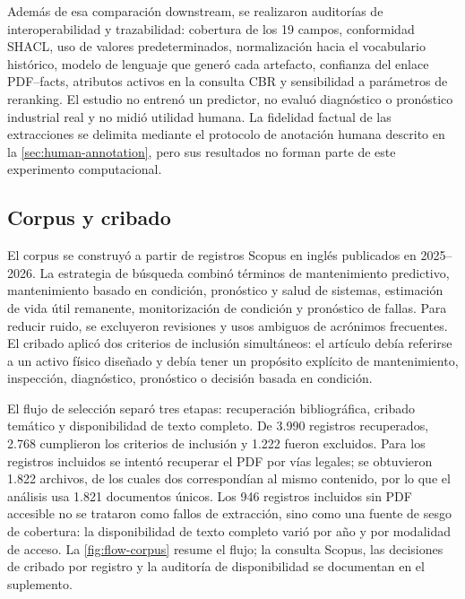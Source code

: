 \documentclass[11pt,a4paper]{article}
\begin{document}
Además de esa comparación downstream, se realizaron auditorías de interoperabilidad y trazabilidad: cobertura de los 19 campos, conformidad SHACL, uso de valores predeterminados, normalización hacia el vocabulario histórico, modelo de lenguaje que generó cada artefacto, confianza del enlace PDF--facts, atributos activos en la consulta CBR y sensibilidad a parámetros de reranking. El estudio no entrenó un predictor, no evaluó diagnóstico o pronóstico industrial real y no midió utilidad humana. La fidelidad factual de las extracciones se delimita mediante el protocolo de anotación humana descrito en la \cref{sec:human-annotation}, pero sus resultados no forman parte de este experimento computacional.

\subsection{Corpus y cribado}

El corpus se construyó a partir de registros Scopus en inglés publicados en 2025--2026. La estrategia de búsqueda combinó términos de mantenimiento predictivo, mantenimiento basado en condición, pronóstico y salud de sistemas, estimación de vida útil remanente, monitorización de condición y pronóstico de fallas. Para reducir ruido, se excluyeron revisiones y usos ambiguos de acrónimos frecuentes. El cribado aplicó dos criterios de inclusión simultáneos: el artículo debía referirse a un activo físico diseñado y debía tener un propósito explícito de mantenimiento, inspección, diagnóstico, pronóstico o decisión basada en condición.

El flujo de selección separó tres etapas: recuperación bibliográfica, cribado temático y disponibilidad de texto completo. De 3.990 registros recuperados, 2.768 cumplieron los criterios de inclusión y 1.222 fueron excluidos. Para los registros incluidos se intentó recuperar el PDF por vías legales; se obtuvieron 1.822 archivos, de los cuales dos correspondían al mismo contenido, por lo que el análisis usa 1.821 documentos únicos. Los 946 registros incluidos sin PDF accesible no se trataron como fallos de extracción, sino como una fuente de sesgo de cobertura: la disponibilidad de texto completo varió por año y por modalidad de acceso. La \cref{fig:flow-corpus} resume el flujo; la consulta Scopus, las decisiones de cribado por registro y la auditoría de disponibilidad se documentan en el suplemento.
\end{document}
